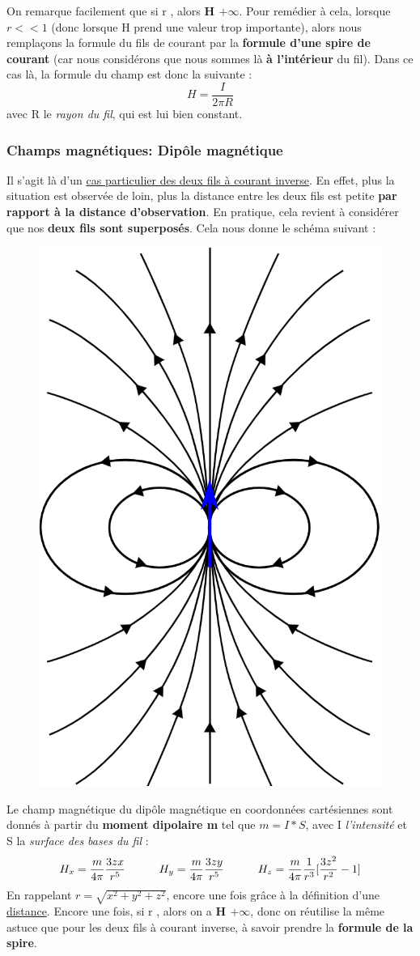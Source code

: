 \documentclass[10pt,a4paper]{article}
\begin{document}
On remarque facilement que si r , alors \textbf{H \textrightarrow $+\infty$}. Pour remédier à cela, lorsque $r << 1$ (donc lorsque H prend une valeur trop importante), alors nous remplaçons la formule du fils de courant par la \textbf{formule d'une spire de courant} (car nous considérons que nous sommes là \textbf{à l'intérieur} du fil).
\newline
Dans ce cas là, la formule du champ est donc la suivante :
\begin{equation}
H = \frac{I}{2\pi R}
\label{eq11}
\end{equation}
avec R le \textit{rayon du fil}, qui est lui bien constant.
\newpage
\subsubsection{Champs magnétiques: Dipôle magnétique}
Il s'agit là d'un \underline{cas particulier des deux fils à courant inverse}. En effet, plus la situation est observée de loin, plus la distance entre les deux fils est petite \textbf{par rapport à la distance d'observation}. En pratique, cela revient à considérer que nos \textbf{deux fils sont superposés}. Cela nous donne le schéma suivant :
\begin{figure}[h]
	\centering
    \includegraphics[width=.3\linewidth]{img_yamato/Dipole.png}
\end{figure}
\newline
Le champ magnétique du dipôle magnétique en coordonnées cartésiennes sont donnés à partir du \textbf{moment dipolaire m} tel que  $m=I*S$, avec I \textit{l'intensité} et S la \textit{surface des bases du fil} \cite{site6}:
\begin{equation}
H_{x} = \frac{m}{4\pi}\frac{3zx}{r^5}\indent\indent H_{y} = \frac{m}{4\pi}\frac{3zy}{r^5}\indent\indent H_{z}=\frac{m}{4\pi}\frac{1}{r^3}[\frac{3z^2}{r^2} - 1]
\end{equation}
En rappelant \textbf{$r = \sqrt{x^2 + y^2 +z^2}$}, encore une fois grâce à la définition d'une \underline{distance}.
\newline
Encore une fois, si r , alors on a \textbf{H \textrightarrow $+\infty$}, donc on réutilise la même astuce que pour les deux fils à courant inverse, à savoir prendre la \textbf{formule de la spire}.
\end{document}
